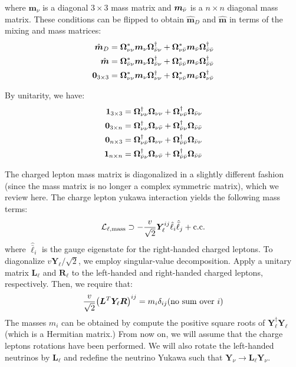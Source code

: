 where \(\bm{m}_{\nu}\) is a diagonal \(3\times3\) mass matrix and \(\bm{m}_{\bar{\nu}}\) is a
\(n\times n\) diagonal mass matrix. These conditions can be flipped to obtain \(\hat{\bm{m}}_{D}\) and \(\hat{\bm{m}}\)
in terms of the mixing and mass matrices:
\begin{align}
	\hat{\bm{m}}_{D}  & = \bm{\Omega}_{\nu\nu}^{*}\bm{m}_{\nu}\bm{\Omega}_{\bar{\nu}\nu}^{\dagger} + \bm{\Omega}_{\nu\bar{\nu}}^{*}\bm{m}_{\bar{\nu}}\bm{\Omega}_{\bar{\nu}\bar{\nu}}^{\dagger} \\
	\hat{\bm{m}}      & = \bm{\Omega}_{\bar{\nu}\nu}^{*}\bm{m}_{\nu}\bm{\Omega}_{\bar{\nu}\nu}^{\dagger} + \bm{\Omega}_{\bar{\nu}\bar{\nu}}^{*}\bm{m}_{\bar{\nu}}\bm{\Omega}_{\bar{\nu}\bar{\nu}}^{\dagger} \\
	\bm{0}_{3\times3} & = \bm{\Omega}_{\nu\nu}^{*}\bm{m}_{\nu}\bm{\Omega}_{\nu\nu}^{\dagger} + \bm{\Omega}_{\nu\bar{\nu}}^{*}\bm{m}_{\bar{\nu}}\bm{\Omega}_{\nu\bar{\nu}}^{\dagger}
\end{align}


By unitarity, we have:
\begin{align}
	\bm{1}_{3\times3}  & = \bm{\Omega}_{\nu\nu}^{\dagger}\bm{\Omega}_{\nu\nu}+\bm{\Omega}_{\nu\bar{\nu}}^{\dagger}\bm{\Omega}_{\bar{\nu}\nu} \\
	\bm{0}_{3\times n} & = \bm{\Omega}_{\nu\nu}^{\dagger}\bm{\Omega}_{\nu\bar{\nu}}+\bm{\Omega}_{\bar{\nu}\nu}^{\dagger}\bm{\Omega}_{\bar{\nu}\bar{\nu}} \\
	\bm{0}_{n\times3}  & = \bm{\Omega}_{\nu\bar{\nu}}^{\dagger}\bm{\Omega}_{\nu\nu}+\bm{\Omega}_{\bar{\nu}\bar{\nu}}^{\dagger}\bm{\Omega}_{\bar{\nu}\nu} \\
	\bm{1}_{n\times n} & = \bm{\Omega}_{\bar{\nu}\nu}^{\dagger}\bm{\Omega}_{\nu\bar{\nu}}+\bm{\Omega}_{\bar{\nu}\bar{\nu}}^{\dagger}\bm{\Omega}_{\bar{\nu}\bar{\nu}}
\end{align}

The charged lepton mass matrix is diagonalized in a slightly different fashion (since the mass matrix
is no longer a complex symmetric matrix), which we review here. The charge lepton
yukawa interaction yields the following mass terms:
\begin{align}
	\mathcal{L}_{\ell,\mathrm{mass}}\supset -\frac{v}{\sqrt{2}}\bm{Y}_{\ell}^{ij}
	\hat{\ell}_{i}\hat{\bar{\ell}}_{j} + \mathrm{c.c.}
\end{align}
where \(\hat{\bar{\ell}}_{i}\) is the gauge eigenstate for the right-handed charged leptons.
To diagonalize \(v\bm{Y}_{\ell}/\sqrt{2}\), we employ singular-value decomposition. Apply
a unitary matrix \(\bm{L}_{\ell}\) and \(\bm{R}_{\ell}\) to the left-handed and right-handed
charged leptons, respectively. Then, we require that:
\begin{align}
	\frac{v}{\sqrt{2}}
	\qty(\bm{L}^T\bm{Y}_{\ell}\bm{R})^{ij}
	= m_{i}\delta_{ij}
	(\text{no sum over } i)
\end{align}
The masses \(m_{i}\) can be obtained by compute the positive square roots of
\(\bm{Y}_{\ell}^{\dagger}\bm{Y}_{\ell}\) (which is a Hermitian matrix.) From now on,
we will assume that the charge leptons rotations have been performed. We will also rotate
the left-handed neutrinos by \(\bm{L}_{\ell}\) and redefine the neutrino Yukawa such
that \(\bm{Y}_{\nu}\to \bm{L}_{\ell}\bm{Y}_{\nu}\).

